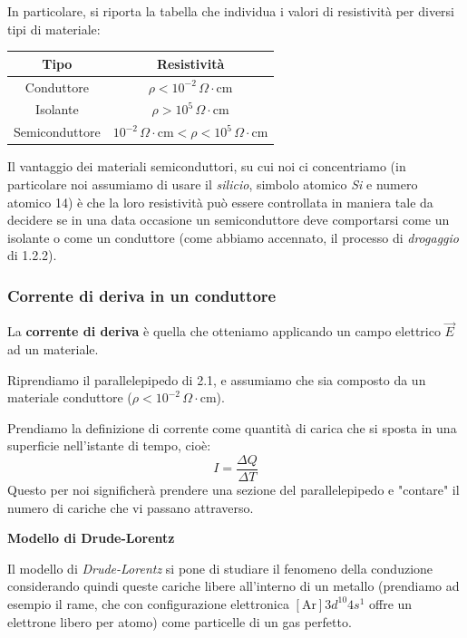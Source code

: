 \documentclass[a4paper,11pt]{article}
\begin{document}
In particolare, si riporta la tabella che individua i valori di resistività per diversi tipi di materiale:
\begin{table}[h!]
	\center {}
	\begin{tabular} { c | c }
		\bfseries Tipo & \bfseries Resistività \\
		\hline
		Conduttore & $\rho < 10^{-2} \, \Omega \cdot \mathrm{cm}$ \\
		Isolante & $\rho > 10^5 \, \Omega \cdot \mathrm{cm}$ \\
		Semiconduttore & $10^{-2} \, \Omega \cdot \mathrm{cm}< \rho < 10^5 \, \Omega \cdot \mathrm{cm}$ \\
	\end{tabular}
\end{table}

Il vantaggio dei materiali semiconduttori, su cui noi ci concentriamo (in particolare noi assumiamo di usare il \textit{silicio}, simbolo atomico \textit{Si} e numero atomico 14) è che la loro resistività può essere controllata in maniera tale da decidere se in una data occasione un semiconduttore deve comportarsi come un isolante o come un conduttore (come abbiamo accennato, il processo di \textit{drogaggio} di 1.2.2).

\subsubsection{Corrente di deriva in un conduttore}
La \textbf{corrente di deriva} è quella che otteniamo applicando un campo elettrico $\vec{E}$ ad un materiale.

Riprendiamo il parallelepipedo di 2.1, e assumiamo che sia composto da un materiale conduttore ($\rho < 10^{-2} \, \Omega \cdot \mathrm{cm}$).

Prendiamo la definizione di corrente come quantità di carica che si sposta in una superficie nell'istante di tempo, cioè:
$$
I = \frac{\Delta Q}{\Delta T}
$$
Questo per noi significherà prendere una sezione del parallelepipedo e "contare" il numero di cariche che vi passano attraverso.

\par\smallskip

\noindent
\textbf{\textsf{Modello di Drude-Lorentz}}

\noindent
Il modello di \textit{Drude-Lorentz} si pone di studiare il fenomeno della conduzione considerando quindi queste cariche libere all'interno di un metallo (prendiamo ad esempio il rame, che con configurazione elettronica $[\mathrm{Ar}]3d^{10}4s^1$ offre un elettrone libero per atomo) come particelle di un gas perfetto.
\end{document}
